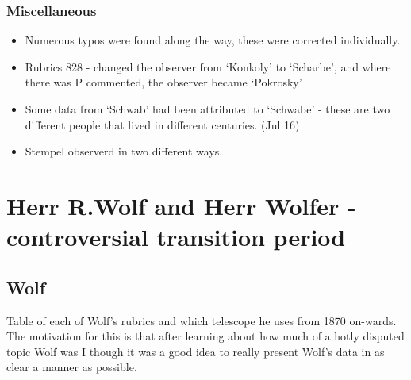 \documentclass[12pt]{article}
\begin{document}
\subsubsection{Miscellaneous}
\begin{itemize}
    \item Numerous typos were found along the way, these were corrected individually.
    \item Rubrics 828 - changed the observer from `Konkoly' to `Scharbe', and where there was P commented, the observer became `Pokrosky'
    
    \item Some data from `Schwab' had been attributed to `Schwabe' - these are two different people that lived in different centuries. (Jul 16)
    \item Stempel observerd in two different ways.
\end{itemize}


\section{Herr R.Wolf and Herr Wolfer - controversial transition period}

\subsection{Wolf}
Table of each of Wolf's rubrics and which telescope he uses from 1870 on-wards. The motivation for this is that after learning about how much of a hotly disputed topic Wolf was I though it was a good idea to really present Wolf's data in as clear a manner as possible.\\
\end{document}
